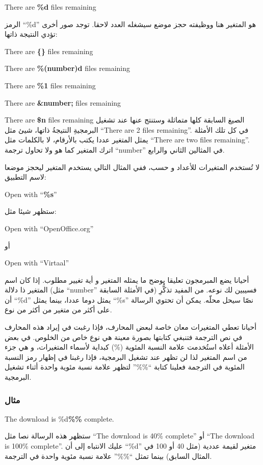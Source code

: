 There are {\bf \%d} files remaining

الرمز ‪“\%d”‬ هو المتغير هنا ووظيفته حجز موضع سيشغله العدد لاحقا. توجد
صور أخرى تؤدي النتيجة ذاتها:

\startitemize[1]
\item There are {\bf \{\}} files remaining
\item There are {\bf \%(number)d} files remaining
\item There are {\bf \%1} files remaining
\item There are {\bf \&number;} files remaining
\item There are {\bf \$n} files remaining
\stopitemize
الصيغ السابقة كلها متماثلة وستنتج عنها عند تشغيل البرمجيةِ النتيجةُ
ذاتها، شيئ مثل “There are 2 files remaining”. في كل تلك الأمثلة يمثل
المتغير عددا يكتب بالأرقام، لا بالكلمات مثل “There are two files
remaining”. اترك المتغير كما هو ولا تحاول ترجمة “number” في المثالين
الثاني والرابع.

لا تُستخدم المتغيرات للأعداد و حسب، ففي المثال التالي يستخدم المتغير
ليحجز موضعا لاسم التطبيق:

Open with “{\bf \%s}”

ستظهر شيئا مثل:

Open with “OpenOffice.org”

أو

Open with “Virtaal”

أحيانا يضع المبرمجون تعليقا يوضح ما يمثله المتغير و أية تغيير مطلوب. إذا
كان اسم المتغير ذا دلالة (مثل “number” في الأمثلة السابقة) فسيبين لك
نوعه. من المفيد تذكُّرِ أن “‪\%d‬” يمثل دوما عددا، بينما يمثل “‪\%s‬”
نصّا سيحل محلّه. يمكن أن تحتوي الرسالة على أكثر من متغير من أكثر من
نوع.

أحيانا تعطي المتغيرات معان خاصة لبعض المحارف، فإذا رغبت في إيراد هذه
المحارف في نص الترجمة فتنبغي كتابتها بصورة معينة هي نوع خاص من الخلوص.
في بعض الأمثلة أعلاه استُخدمت علامة النسبة المئوية (\%) كبداية لأسماء
المتغيرات، و هي جزء من اسم المتغير لذا لن تظهر عند تشغيل البرمجية، فإذا
رغبنا في إظهار رمز النسبة المئوية في الترجمة فعلينا كتابة “\%\%” لتظهر
علامة نسبة مئوية واحدة أثناء تشغيل البرمجية.

\subsubsection{مثال}
The download is \%d{\bf \%\%} complete.

ستظهر هذه الرسالة نصا مثل “The download is 40\% complete” أو “The
download is 100\% complete”. عليك الانتباه إلى أن ‪“\%d”‬ متغير لقيمة
عددية (مثل 40 أو 100 في المثال السابق) بينما تمثل “\%\%” علامة نسبة
مئوية واحدة في الترجمة.

